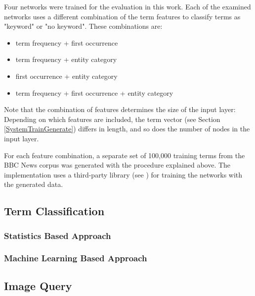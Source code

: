 \documentclass[11pt,a4paper,twoside]{article}
\begin{document}
Four networks were trained for the evaluation in this work. Each of the examined networks uses a different combination of the term features to classify terms as "keyword" or "no keyword". These combinations are:

\vspace{-.5em}
\begin{itemize}
    \setlength\itemsep{0em}
    \item term frequency + first occurrence
    \item term frequency + entity category
    \item first occurrence + entity category
    \item term frequency + first occurrence + entity category
\end{itemize}
\vspace{-.5em}

\noindent Note that the combination of features determines the size of the input layer: Depending on which features are included, the term vector (see Section \ref{SystemTrainGenerate}) differs in length, and so does the number of nodes in the input layer.

For each feature combination, a separate set of 100,000 training terms from the BBC News corpus was generated with the procedure explained above. The implementation uses a third-party library (see \cite{BrainJSBrain.js:JavaScript}) for training the networks with the generated data.

\subsection{Term Classification} \label{SystemClassification}
\subsubsection{Statistics Based Approach} \label{SystemClassificationStat}
\subsubsection{Machine Learning Based Approach} \label{SystemClassificationML}

\subsection{Image Query} \label{SystemQuery}

\end{document}
